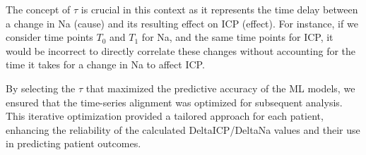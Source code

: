 The concept of $\tau$ is crucial in this context as it represents the time delay between a change in Na (cause) and its resulting effect on ICP (effect). For instance, if we consider time points $T_0$ and $T_1$ for Na, and the same time points for ICP, it would be incorrect to directly correlate these changes without accounting for the time it takes for a change in Na to affect ICP. 




By selecting the $\tau$ that maximized the predictive accuracy of the ML models, we ensured that the time-series alignment was optimized for subsequent analysis. This iterative optimization provided a tailored approach for each patient, enhancing the reliability of the calculated DeltaICP/DeltaNa values and their use in predicting patient outcomes.


